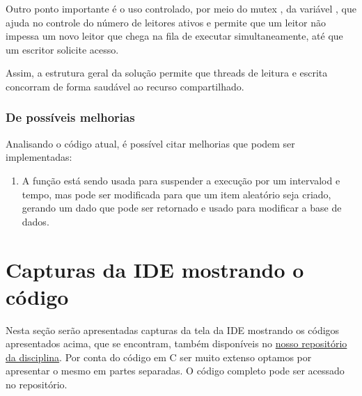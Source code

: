 \documentclass[
	12pt,				%
	openright,			%
	oneside,			%
	a4paper,			%
	chapter=TITLE,		%
	english,			%
	french,				%
	spanish,			%
	brazil				%
	]{abntex2}
\theoremstyle{definition}
\begin{document}
Outro ponto importante é o uso controlado, por meio do mutex , da variável , que ajuda no controle do número de leitores ativos e permite que um leitor não impessa um novo leitor que chega na fila de executar simultaneamente, até que um escritor solicite acesso.

Assim, a estrutura geral da solução permite que threads de leitura e escrita concorram de forma saudável ao recurso compartilhado.

\subsubsection{De possíveis melhorias}

Analisando o código atual, é possível citar melhorias que podem ser implementadas:
\begin{enumerate}
    \item A função  está sendo usada para suspender a execução por um intervalod e tempo, mas pode ser modificada para que um item aleatório seja criado, gerando um dado que pode ser retornado e usado para modificar a base de dados.
\end{enumerate}
\newpage
\section{Capturas da IDE mostrando o código}

Nesta seção serão apresentadas capturas da tela da IDE mostrando os códigos apresentados acima, que se encontram, também disponíveis no
\href{https://github.com/jvictorferreira3301/Sistemas_Operacionais}{nosso repositório da disciplina}.
Por conta do código em C ser muito extenso optamos por apresentar o mesmo em partes separadas. O código completo pode ser acessado no repositório.
\end{document}
